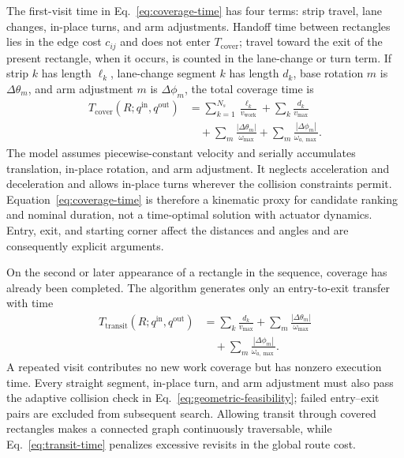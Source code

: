 The first-visit time in Eq.~\eqref{eq:coverage-time} has four terms: strip travel, lane changes, in-place turns, and arm adjustments. Handoff time between rectangles lies in the edge cost $c_{ij}$ and does not enter $T_{\mathrm{cover}}$; travel toward the exit of the present rectangle, when it occurs, is counted in the lane-change or turn term. If strip $k$ has length $\ell_k$, lane-change segment $k$ has length $d_k$, base rotation $m$ is $\Delta\theta_m$, and arm adjustment $m$ is $\Delta\phi_m$, the total coverage time is
\begin{equation}
\begin{aligned}
T_{\mathrm{cover}}(R;q^{\mathrm{in}},q^{\mathrm{out}})
&=\sum_{k=1}^{N_s}\frac{\ell_k}{v_{\mathrm{work}}}
+\sum_k\frac{d_k}{v_{\max}}\\
&\quad+\sum_m\frac{|\Delta\theta_m|}{\omega_{\max}}
+\sum_m\frac{|\Delta\phi_m|}{\omega_{a,\max}}.
\end{aligned}
\tag{18}
\label{eq:coverage-time}
\end{equation}
The model assumes piecewise-constant velocity and serially accumulates translation, in-place rotation, and arm adjustment. It neglects acceleration and deceleration and allows in-place turns wherever the collision constraints permit. Equation~\eqref{eq:coverage-time} is therefore a kinematic proxy for candidate ranking and nominal duration, not a time-optimal solution with actuator dynamics. Entry, exit, and starting corner affect the distances and angles and are consequently explicit arguments.

On the second or later appearance of a rectangle in the sequence, coverage has already been completed. The algorithm generates only an entry-to-exit transfer with time
\begin{equation}
\begin{aligned}
T_{\mathrm{transit}}(R;q^{\mathrm{in}},q^{\mathrm{out}})
&=\sum_k\frac{d_k}{v_{\max}}
+\sum_m\frac{|\Delta\theta_m|}{\omega_{\max}}\\
&\quad+\sum_m\frac{|\Delta\phi_m|}{\omega_{a,\max}}.
\end{aligned}
\tag{19}
\label{eq:transit-time}
\end{equation}
A repeated visit contributes no new work coverage but has nonzero execution time. Every straight segment, in-place turn, and arm adjustment must also pass the adaptive collision check in Eq.~\eqref{eq:geometric-feasibility}; failed entry--exit pairs are excluded from subsequent search. Allowing transit through covered rectangles makes a connected graph continuously traversable, while Eq.~\eqref{eq:transit-time} penalizes excessive revisits in the global route cost.

